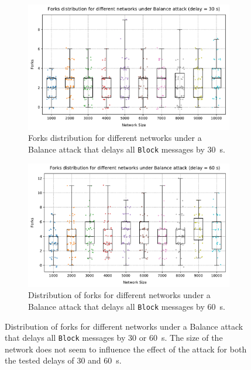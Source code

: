 \begin{figure}[ht]
	\begin{subfigure}{\textwidth}
		\centering
		\includegraphics[width=\myplotswitdth \columnwidth]{plots/forks_attack_delay_30_network_sizes_boxplot}
		\vspace*{0.25cm}
		\caption{Forks distribution for different networks under a Balance attack that delays all \texttt{Block} messages by \SI{30}{\second}.}
		\vspace*{0.75cm}
	\end{subfigure}
	\begin{subfigure}{\textwidth}
		\centering
		\vspace*{0.25cm}
		\includegraphics[width=\myplotswitdth \columnwidth]{plots/forks_attack_delay_60_network_sizes_boxplot}
		\vspace*{0.25cm}
		\caption{Distribution of forks for different networks under a Balance attack that delays all \texttt{Block} messages by \SI{60}{\second}.}
		\vspace*{0.25cm}
	\end{subfigure}
	\caption[Forks distribution for different networks under Balance attack]{
		Distribution of forks for different networks under a Balance attack that delays all \texttt{Block} messages by \num{30} or \SI{60}{\second}.
		The size of the network does not seem to influence the effect of the attack for both the tested delays of \num{30} and \SI{60}{\second}.
	}
	\label{fig:forks-attack-sizes}
\end{figure}

